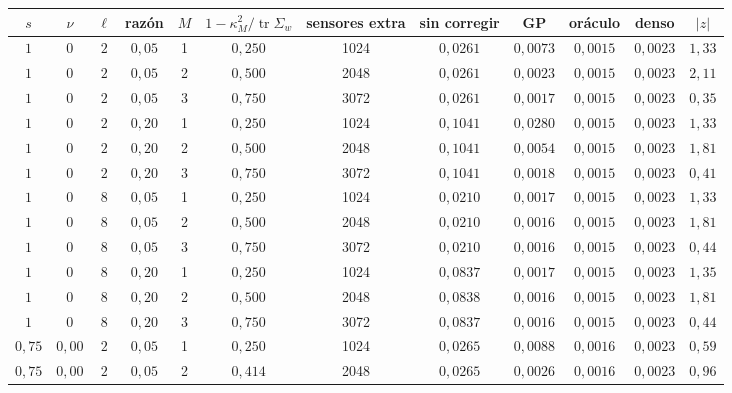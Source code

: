 \begin{tabular}{cccccccccccc}
\toprule
$s$ & $\nu$ & $\ell$ & razón & $M$ & $1 - \kappa_M^2/\operatorname{tr}\Sigma_w$ & sensores extra & sin corregir & GP & oráculo & denso & $|z|$ \\
\midrule
$1$ & $0$ & $2$ & $0{,}05$ & 1 & $0{,}250$ & 1024 & $0{,}0261$ & $0{,}0073$ & $0{,}0015$ & $0{,}0023$ & $1{,}33$ \\
$1$ & $0$ & $2$ & $0{,}05$ & 2 & $0{,}500$ & 2048 & $0{,}0261$ & $0{,}0023$ & $0{,}0015$ & $0{,}0023$ & $2{,}11$ \\
$1$ & $0$ & $2$ & $0{,}05$ & 3 & $0{,}750$ & 3072 & $0{,}0261$ & $0{,}0017$ & $0{,}0015$ & $0{,}0023$ & $0{,}35$ \\
$1$ & $0$ & $2$ & $0{,}20$ & 1 & $0{,}250$ & 1024 & $0{,}1041$ & $0{,}0280$ & $0{,}0015$ & $0{,}0023$ & $1{,}33$ \\
$1$ & $0$ & $2$ & $0{,}20$ & 2 & $0{,}500$ & 2048 & $0{,}1041$ & $0{,}0054$ & $0{,}0015$ & $0{,}0023$ & $1{,}81$ \\
$1$ & $0$ & $2$ & $0{,}20$ & 3 & $0{,}750$ & 3072 & $0{,}1041$ & $0{,}0018$ & $0{,}0015$ & $0{,}0023$ & $0{,}41$ \\
$1$ & $0$ & $8$ & $0{,}05$ & 1 & $0{,}250$ & 1024 & $0{,}0210$ & $0{,}0017$ & $0{,}0015$ & $0{,}0023$ & $1{,}33$ \\
$1$ & $0$ & $8$ & $0{,}05$ & 2 & $0{,}500$ & 2048 & $0{,}0210$ & $0{,}0016$ & $0{,}0015$ & $0{,}0023$ & $1{,}81$ \\
$1$ & $0$ & $8$ & $0{,}05$ & 3 & $0{,}750$ & 3072 & $0{,}0210$ & $0{,}0016$ & $0{,}0015$ & $0{,}0023$ & $0{,}44$ \\
$1$ & $0$ & $8$ & $0{,}20$ & 1 & $0{,}250$ & 1024 & $0{,}0837$ & $0{,}0017$ & $0{,}0015$ & $0{,}0023$ & $1{,}35$ \\
$1$ & $0$ & $8$ & $0{,}20$ & 2 & $0{,}500$ & 2048 & $0{,}0838$ & $0{,}0016$ & $0{,}0015$ & $0{,}0023$ & $1{,}81$ \\
$1$ & $0$ & $8$ & $0{,}20$ & 3 & $0{,}750$ & 3072 & $0{,}0837$ & $0{,}0016$ & $0{,}0015$ & $0{,}0023$ & $0{,}44$ \\
\midrule
$0{,}75$ & $0{,}00$ & $2$ & $0{,}05$ & 1 & $0{,}250$ & 1024 & $0{,}0265$ & $0{,}0088$ & $0{,}0016$ & $0{,}0023$ & $0{,}59$ \\
$0{,}75$ & $0{,}00$ & $2$ & $0{,}05$ & 2 & $0{,}414$ & 2048 & $0{,}0265$ & $0{,}0026$ & $0{,}0016$ & $0{,}0023$ & $0{,}96$ \\

\end{tabular}
